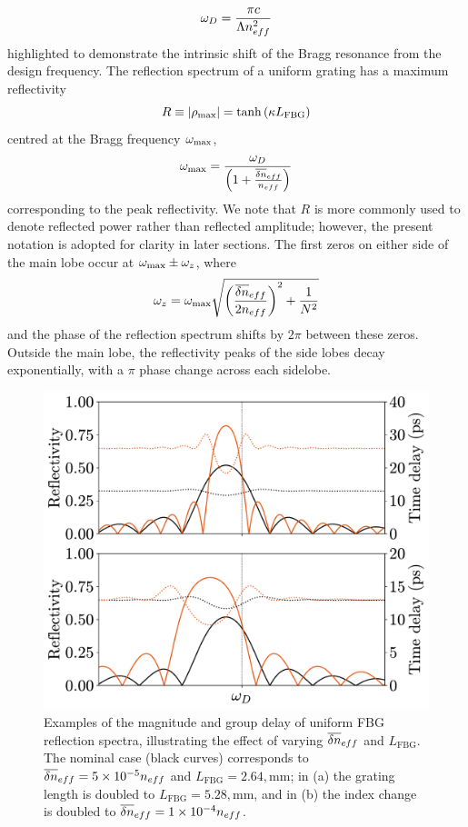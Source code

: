 %
\begin{equation}
    \omega_D = \frac{\pi c}{\Lambda n_{eff}^2}
\end{equation}
%
highlighted to demonstrate the intrinsic shift of the Bragg resonance from the design frequency. The reflection spectrum of a uniform grating has a maximum reflectivity
%
\begin{equation}
\label{eq:rmax}
    R \equiv |\rho_\text{max}| = \tanh{(\kappa L_\text{FBG})}
\end{equation}
%
centred at the Bragg frequency $\omega_\text{max}$,
%
\begin{equation}
\label{eq:wBragg}
    \omega_\text{max} = \frac{\omega_D}{\left( 1 + \frac{\overline{\delta n}_{eff} }{n_{eff}}\right)}
\end{equation}
%
corresponding to the peak reflectivity.
We note that $R$ is more commonly used to denote reflected power rather than reflected amplitude; however, the present notation is adopted for clarity in later sections.
The first zeros on either side of the main lobe occur at $\omega_\text{max} \pm \omega_z$, where
%
\begin{equation}
\label{eq:wz}
    \omega_z = \omega_\text{max} \sqrt{\left( \frac{\overline{\delta n}_{eff}}{2 n_{eff}} \right)^2 + \frac{1}{N^2} }
\end{equation}
%
and the phase of the reflection spectrum shifts by $2\pi$ between these zeros.
Outside the main lobe, the reflectivity peaks of the side lobes decay exponentially, with a $\pi$ phase change across each sidelobe.
%
\begin{figure}[!t]
    \includegraphics[width=\linewidth]{Images/Uniform_varying_L_dneff.pdf}
    \caption{Examples of the magnitude and group delay of uniform FBG reflection spectra, illustrating the effect of varying $\overline{\delta n}_{eff}$ and $L_\text{FBG}$. 
    The nominal case (black curves) corresponds to $\overline{\delta n}_{eff} = 5\times 10^{-5}n_{eff}$ and $L_\text{FBG} = 2.64,\text{mm}$; in (a) the grating length is doubled to $L_\text{FBG} = 5.28,\text{mm}$, and in (b) the index change is doubled to $\overline{\delta n}_{eff} = 1\times 10^{-4}n_{eff}$.}
    \label{fig:uniform_spectra_varyLdneff}
\end{figure}
